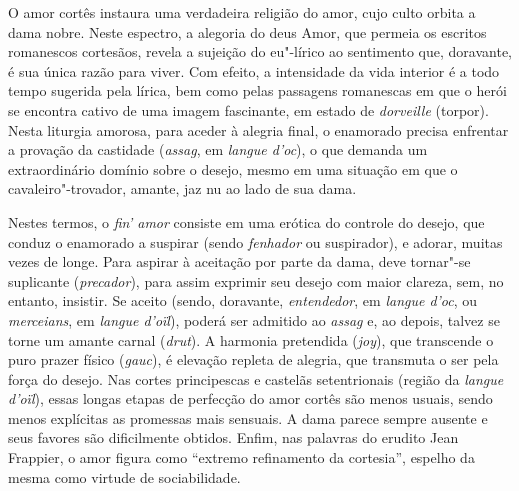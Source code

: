O amor cortês instaura uma verdadeira religião do amor, cujo culto orbita a dama
nobre. Neste espectro, a alegoria do deus Amor, que permeia os escritos
romanescos cortesãos, revela a sujeição do eu"-lírico ao sentimento que,
doravante, é sua única razão para viver. Com efeito, a intensidade da vida
interior é a todo tempo sugerida pela lírica, bem como pelas passagens
romanescas em que o herói se encontra cativo de uma imagem fascinante, em
estado de \textit{dorveille} (torpor). Nesta liturgia amorosa, para aceder à
alegria final, o enamorado precisa enfrentar a provação da castidade
(\textit{assag}, em \textit{langue d’oc}), o que demanda um extraordinário
domínio sobre o desejo, mesmo em uma situação em que o cavaleiro"-trovador,
amante, jaz nu ao lado de sua dama. 

Nestes termos, o \textit{fin’ amor} consiste em uma erótica do controle do
desejo, que conduz o enamorado a suspirar (sendo \textit{fenhador} ou
suspirador), e adorar, muitas vezes de longe. Para aspirar à aceitação por parte
da dama, deve tornar"-se suplicante (\textit{precador}), para assim exprimir seu
desejo com maior clareza, sem, no entanto, insistir. Se aceito (sendo,
doravante, \textit{entendedor}, em \textit{langue d’oc}, ou \textit{merceians},
em \textit{langue d’oïl}), poderá ser admitido ao \textit{assag} e, ao depois,
talvez se torne um amante carnal (\textit{drut}).  A harmonia pretendida
(\textit{joy}), que transcende o puro prazer físico (\textit{gauc}), é elevação
repleta de alegria, que transmuta o ser pela força do desejo. Nas cortes
principescas e castelãs setentrionais (região da \textit{langue d’oïl}), essas
longas etapas de perfecção do amor cortês são menos usuais, sendo menos
explícitas as promessas mais sensuais. A dama parece sempre ausente e seus
favores são dificilmente obtidos. Enfim, nas palavras do erudito Jean Frappier,
o amor figura como “extremo refinamento da cortesia”, espelho da mesma como
virtude de sociabilidade. 

